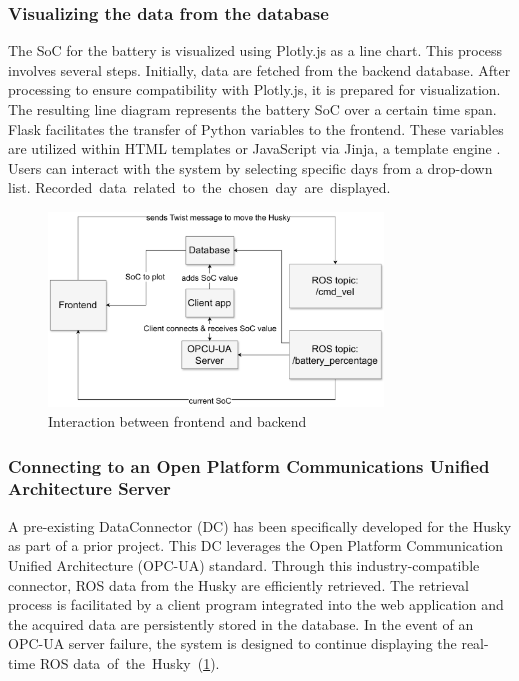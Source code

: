 \documentclass[conference]{IEEEtran}
\begin{document}
\subsubsection{Visualizing the data from the database}
The SoC for the battery is visualized using Plotly.js as a line chart. This process involves several steps. Initially, data are fetched from the backend database. After processing to ensure compatibility with Plotly.js, it is prepared for visualization. The resulting line diagram represents the battery SoC over a certain time span. Flask facilitates the transfer of Python variables to the frontend. 
These variables are utilized within HTML templates or JavaScript via Jinja, a template engine \cite{jinja}. Users can interact with the system by selecting specific days from a drop-down list. \mbox{Recorded data related to the chosen day are displayed.}
\begin{figure}[tp]
    \centerline{\includegraphics[width=8.9cm]{Pictures/backfrontbig.pdf}}
    \caption{Interaction between frontend and backend}
    \label{fig:backfront}
\end{figure}
\subsubsection{Connecting to an Open Platform Communications Unified Architecture Server}
A pre-existing DataConnector (DC) has been specifically developed for the Husky as part of a prior project. This DC leverages the Open Platform Communication Unified Architecture \cite{opcua} (OPC-UA) standard. Through this industry-compatible connector,  ROS data from the Husky are efficiently retrieved. The retrieval process is facilitated by a client program integrated into the web application and the acquired data are persistently stored in the database. 
In the event of an OPC-UA server failure, the system is designed to continue displaying the real-time ROS \mbox{data of the Husky (\cref{fig:backfront}).}
\end{document}
